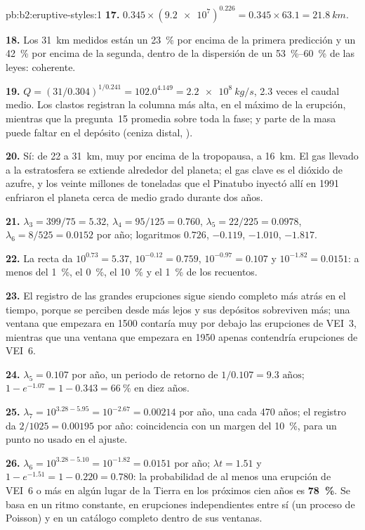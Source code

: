 \begin{solution}{pb:b2:eruptive-styles:1}
\textbf{17.} $0.345\times(\num{9.2e7})^{0.226} = 0.345\times63.1 = \qty{21.8}{km}$.

\textbf{18.} Los \qty{31}{km} medidos están un \qty{23}{\percent} por encima de la primera
predicción y un \qty{42}{\percent} por encima de la segunda, dentro de la
dispersión de un \qtyrange{53}{60}{\percent} de las leyes: coherente.

\textbf{19.} $Q = (31/0.304)^{1/0.241} = 102.0^{4.149} = \qty{2.2e8}{kg/s}$, 2.3 veces
el caudal medio. Los clastos registran la columna más alta, en el máximo de la
erupción, mientras que la pregunta~15 promedia sobre toda la fase; y parte de la masa
puede faltar en el depósito (ceniza distal, ).

\textbf{20.} Sí: de 22 a \qty{31}{km}, muy por encima de la tropopausa, a \qty{16}{km}.
El gas llevado a la estratosfera se extiende alrededor del planeta; el gas clave es el
dióxido de azufre, y los veinte millones de toneladas que el Pinatubo inyectó allí en 1991
enfriaron el planeta cerca de medio grado durante dos años.

\textbf{21.} $\lambda_3 = 399/75 = 5.32$, $\lambda_4 = 95/125 = 0.760$, $\lambda_5 = 22/225 =
0.0978$, $\lambda_6 = 8/525 = 0.0152$ por año; logaritmos $0.726$, $-0.119$, $-1.010$,
$-1.817$.

\textbf{22.} La recta da $10^{0.73} = 5.37$, $10^{-0.12} = 0.759$, $10^{-0.97} =
0.107$ y $10^{-1.82} = 0.0151$: a menos del \qty{1}{\percent}, el \qty{0}{\percent},
el \qty{10}{\percent} y el \qty{1}{\percent} de los recuentos.

\textbf{23.} El registro de las grandes erupciones sigue siendo completo más atrás en el tiempo,
porque se perciben desde más lejos y sus depósitos sobreviven más; una
ventana que empezara en 1500 contaría muy por debajo las erupciones de VEI~3, mientras que una ventana
que empezara en 1950 apenas contendría erupciones de VEI~6.

\textbf{24.} $\lambda_5 = \num{0.107}$ por año, un periodo de retorno de $1/0.107 =
\num{9.3}\text{ años}$; $1 - e^{-1.07} = 1 - 0.343 = \qty{66}{\percent}$ en diez años.

\textbf{25.} $\lambda_7 = 10^{3.28 - 5.95} = 10^{-2.67} = 0.00214$ por año, una cada
470 años; el registro da $2/1025 = 0.00195$ por año: coincidencia con un margen del
\qty{10}{\percent}, para un punto no usado en el ajuste.

\textbf{26.} $\lambda_6 = 10^{3.28 - 5.10} = 10^{-1.82} = 0.0151$ por año; $\lambda t = 1.51$
y $1 - e^{-1.51} = 1 - 0.220 = 0.780$: la probabilidad de al menos una erupción
de VEI~6 o más en algún lugar de la Tierra en los próximos cien años es
\textbf{\qty[text-series-to-math=true]{78}{\percent}}. Se basa en un ritmo constante,
en erupciones independientes entre sí (un proceso de Poisson) y en un
catálogo completo dentro de sus ventanas.
\end{solution}

